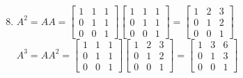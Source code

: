 \documentclass[a4paper, 12pt]{article}
\begin{document}
\begin{enumerate}
		\setcounter{enumi}{7}
		\item $A^2 = AA = \left[ \begin{array}{ccc}
		1 & 1 & 1 \\
		0 & 1 & 1 \\
		0 & 0 & 1 \end{array} \right]
		\left[ \begin{array}{ccc}
		1 & 1 & 1 \\
		0 & 1 & 1 \\
		0 & 0 & 1 \end{array} \right]
		= \left[ \begin{array}{ccc}
		1 & 2 & 3 \\
		0 & 1 & 2 \\
		0 & 0 & 1 \end{array} \right]$ \\
		
		$A^3 = AA^2 = \left[ \begin{array}{ccc}
		1 & 1 & 1 \\
		0 & 1 & 1 \\
		0 & 0 & 1 \end{array} \right]
		\left[ \begin{array}{ccc}
		1 & 2 & 3 \\
		0 & 1 & 2 \\
		0 & 0 & 1 \end{array} \right]
		= \left[ \begin{array}{ccc}
		1 & 3 & 6 \\
		0 & 1 & 3 \\
		0 & 0 & 1 \end{array} \right]$ \\
		

\end{enumerate}
\end{document}
